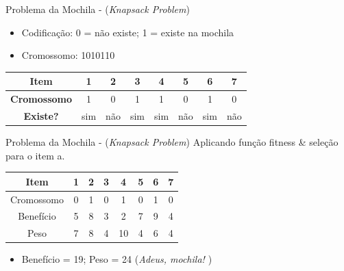 \documentclass[mathserif, 10pt]{beamer}
\begin{document}
\begin{frame}{Problema da Mochila - (\textit{Knapsack Problem})}
	\justifying
	\begin{itemize}
		\item Codificação: 0 = não existe; 1 = existe na mochila
		\item Cromossomo: 1010110 \\
	\end{itemize}
	\vspace{1mm}
	\centering
	\begin{tabular}{|c|c|c|c|c|c|c|c|}
		\hline
		\textbf{Item} & \textbf{1} & \textbf{2} & \textbf{3} & \textbf{4} & \textbf{5} & \textbf{6} & \textbf{7} \\
		\hline
		\textbf{Cromossomo} & 1 & 0 & 1 & 1 & 0 & 1 & 0 \\
		\hline
		\textbf{Existe?} & sim & não & sim & sim & não & sim & não \\
		\hline
	\end{tabular}
	\vspace{2mm}
	
	\begin{itemize}
	\end{itemize}
	
\end{frame}

\begin{frame}{Problema da Mochila - (\textit{Knapsack Problem})}
	\justifying
	Aplicando função fitness \& seleção para o item a. \\
	
	\centering
	\vspace{2mm}
	\begin{tabular}{|c|c|c|c|c|c|c|c|}
		\hline
		Item & 1 & 2 & 3 & 4 & 5 & 6 & 7 \\
		\hline
		Cromossomo & 0 & 1 & 0 & 1 & 0 & 1 & 0 \\
		\hline
		Benefício & 5 & 8 & 3 & 2 & 7 & 9 & 4 \\
		\hline
		Peso & 7 & 8 & 4 & 10 & 4 & 6 & 4 \\
		\hline
	\end{tabular}
	
	\vspace{2mm}
	\begin{itemize}
		\item [a)] Benefício = 19; Peso = 24 (\textit{Adeus, mochila! \textcolor{red}{\texttimes}})
	\end{itemize}
\end{frame}
\end{document}
